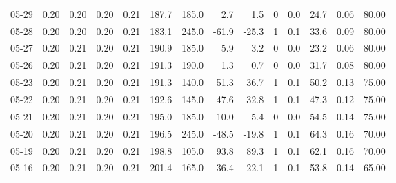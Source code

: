 \begin{threeparttable}
{\begin{tabular}{lrrrrrrrrrrrrr}
  05-29 &          0.20 &          0.20 &          0.20 &        0.21 &               187.7 &               185.0 &        2.7 &          1.5 &              0 &                 0.0 &             24.7 &            0.06 &                  80.00 \\
  05-28 &          0.20 &          0.20 &          0.20 &        0.21 &               183.1 &               245.0 &      -61.9 &        -25.3 &              1 &                 0.1 &             33.6 &            0.09 &                  80.00 \\
  05-27 &          0.20 &          0.21 &          0.20 &        0.21 &               190.9 &               185.0 &        5.9 &          3.2 &              0 &                 0.0 &             23.2 &            0.06 &                  80.00 \\
  05-26 &          0.20 &          0.21 &          0.20 &        0.21 &               191.3 &               190.0 &        1.3 &          0.7 &              0 &                 0.0 &             31.7 &            0.08 &                  80.00 \\
  05-23 &          0.20 &          0.21 &          0.20 &        0.21 &               191.3 &               140.0 &       51.3 &         36.7 &              1 &                 0.1 &             50.2 &            0.13 &                  75.00 \\
  05-22 &          0.20 &          0.21 &          0.20 &        0.21 &               192.6 &               145.0 &       47.6 &         32.8 &              1 &                 0.1 &             47.3 &            0.12 &                  75.00 \\
  05-21 &          0.20 &          0.21 &          0.20 &        0.21 &               195.0 &               185.0 &       10.0 &          5.4 &              0 &                 0.0 &             54.5 &            0.14 &                  75.00 \\
  05-20 &          0.20 &          0.21 &          0.20 &        0.21 &               196.5 &               245.0 &      -48.5 &        -19.8 &              1 &                 0.1 &             64.3 &            0.16 &                  70.00 \\
  05-19 &          0.20 &          0.21 &          0.20 &        0.21 &               198.8 &               105.0 &       93.8 &         89.3 &              1 &                 0.1 &             62.1 &            0.16 &                  70.00 \\
  05-16 &          0.20 &          0.21 &          0.20 &        0.21 &               201.4 &               165.0 &       36.4 &         22.1 &              1 &                 0.1 &             53.8 &            0.14 &                  65.00 \\

\end{tabular}}
\end{threeparttable}
